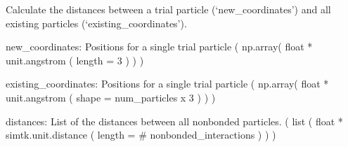 \documentclass[letterpaper,12pt,english,openany,twoside]{sphinxmanual}
\begin{document}

\begin{fulllineitems}
\label{\detokenize{util:util.non_bonded_distances}}
Calculate the distances between a trial particle (‘new\_coordinates’)
and all existing particles (‘existing\_coordinates’).

new\_coordinates: Positions for a single trial particle
( np.array( float * unit.angstrom ( length = 3 ) ) )

existing\_coordinates: Positions for a single trial particle
( np.array( float * unit.angstrom ( shape = num\_particles x 3 ) ) )

distances: List of the distances between all nonbonded particles.
( list ( float * simtk.unit.distance ( length = \# nonbonded\_interactions ) ) )

\end{fulllineitems}

\end{document}

